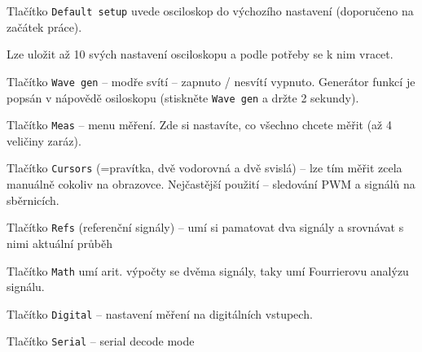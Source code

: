 Tlačítko \texttt{Default setup} uvede osciloskop do výchozího nastavení (doporučeno na začátek práce).

Lze uložit až 10 svých nastavení osciloskopu a podle potřeby se k nim vracet.  %

 Tlačítko  \texttt{Wave  gen} -- modře svítí -- zapnuto / nesvítí vypnuto. 
 Generátor funkcí je popsán v nápovědě osiloskopu (stiskněte \texttt{Wave  gen} a držte 2 sekundy). 

 Tlačítko \texttt{Meas}  -- menu měření.
Zde si nastavíte, co všechno chcete měřit  (až 4 veličiny zaráz).

Tlačítko \texttt{Cursors}   (=pravítka, dvě vodorovná a dvě svislá)  -- lze tím měřit zcela manuálně cokoliv na obrazovce.
Nejčastější použití -- sledování PWM a signálů na sběrnicích. 

Tlačítko \texttt{Refs}  (referenční signály) -- umí si pamatovat dva signály a srovnávat s nimi aktuální průběh  %

Tlačítko \texttt{Math}  umí arit. výpočty se dvěma signály, taky umí Fourrierovu analýzu signálu. 

Tlačítko  \texttt{Digital} -- nastavení měření na digitálních vstupech.

Tlačítko   \texttt{Serial} -- serial decode mode  





%	
%	
%	
%	
%	
%	











